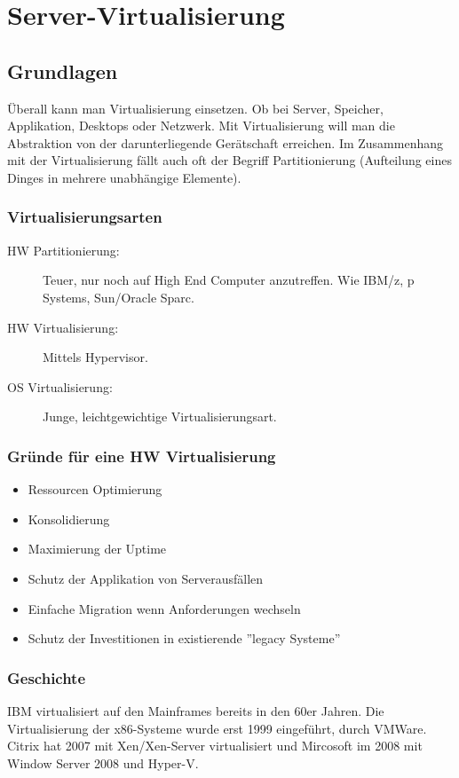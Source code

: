 \chapter{Server-Virtualisierung}

\section{Grundlagen}
Überall kann man Virtualisierung einsetzen. Ob bei Server, Speicher, Applikation, Desktops oder Netzwerk. Mit Virtualisierung will man die Abstraktion von der darunterliegende Gerätschaft erreichen. Im Zusammenhang mit der Virtualisierung fällt auch oft der Begriff Partitionierung (Aufteilung eines Dinges in mehrere unabhängige Elemente).

\subsection{Virtualisierungsarten}
\label{sec:virtualisierungsarten}
\begin{description}
	\item[HW Partitionierung:] Teuer, nur noch auf High End Computer anzutreffen. Wie IBM/z, p Systems, Sun/Oracle Sparc.
	\item[HW Virtualisierung:] Mittels Hypervisor.
	\item[OS Virtualisierung:] Junge, leichtgewichtige Virtualisierungsart.
\end{description}

\subsection{Gründe für eine HW Virtualisierung}
\label{sec:gruende-hw-virtualisierung}
\begin{itemize}
	\item Ressourcen Optimierung
	\item Konsolidierung
	\item Maximierung der Uptime
	\item Schutz der Applikation von Serverausfällen
	\item Einfache Migration wenn Anforderungen wechseln
	\item Schutz der Investitionen in existierende ''legacy Systeme'' 
\end{itemize}

\subsection{Geschichte}
IBM virtualisiert auf den Mainframes bereits in den 60er Jahren. Die Virtualisierung der x86-Systeme wurde erst 1999 eingeführt, durch VMWare. Citrix hat 2007 mit Xen/Xen-Server virtualisiert und Mircosoft im 2008 mit Window Server 2008 und Hyper-V.

